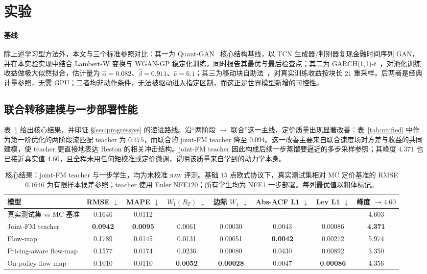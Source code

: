 \documentclass[11pt]{ctexart}
\newcommand{\tablebodysetup}{\footnotesize\setlength{\tabcolsep}{2pt}\renewcommand{\arraystretch}{1.12}}
\newcommand{\raw}{\textsc{raw}}
\newcommand{\best}[1]{\textbf{#1}}
\begin{document}
\section{实验}
\label{sec:results}

\paragraph{基线}
除上述学习型方法外，本文与三个标准参照对比：其一为 Quant-GAN~\citep{wiese2020quant} 核心结构基线，以 TCN 生成器/判别器复现金融时间序列 GAN，并在本实验实现中结合 Lambert-W 变换与 WGAN-GP 稳定化训练，同时报告其最优与最后检查点；其二为 GARCH(1,1)-$t$~\citep{bollerslev1986garch,bollerslev1987conditionally}，对池化训练收益做极大似然拟合，估计量为 $\hat\alpha{=}0.082$、$\hat\beta{=}0.911$、$\hat\nu{=}6.1$；其三为移动块自助法~\citep{kunsch1989jackknife,politis1994stationary}，对真实训练收益按块长 $21$ 重采样。后两者是经典计量参照，无需 GPU；二者均非动作条件，无法被驱动进入指定区制，而这正是世界模型新增的可控性。

\subsection{联合转移建模与一步部署性能}
\label{sec:res_main}
表~\ref{tab:main_joint} 给出核心结果，并印证 \S\ref{sec:progressive} 的递进路线。沿“两阶段 $\to$ 联合”这一主线，定价质量出现显著改善：表~\ref{tab:unified} 中作为第一阶优化的两阶段流匹配 teacher 为 $0.475$，而联合的 joint-FM teacher 降至 $0.094$。这一改善主要来自联合速度场对方差与收益的共同建模，使 teacher 更直接地表达 Heston 的相关冲击结构。joint-FM teacher 因此构成后续一步蒸馏要逼近的多步采样参照；其峰度 $4.371$ 也已接近真实值 $4.60$，且全程未用任何矩校准或定价微调，说明该质量来自学到的动力学本身。

\begin{table}[htbp]
\centering
\caption{核心结果：joint-FM teacher 与一步学生，均为未校准 \raw{} 评测。基础 $15$ 点欧式协议下，真实测试集相对 MC 定价基准的 RMSE $0.1646$ 为有限样本误差参照；teacher 使用 Euler NFE120；所有学生均为 NFE1 一步部署。每列最优值以粗体标记。}
\label{tab:main_joint}
\tablebodysetup
\begin{tabular}{l c c c c c c c}
\toprule
模型 & RMSE $\downarrow$ & MAPE $\downarrow$ & $W_1(R_T)$ $\downarrow$ & 边际 $W_1$ $\downarrow$ & Abs-ACF L1 $\downarrow$ & Lev L1 $\downarrow$ & 峰度 $\to4.60$ \\
\midrule
真实测试集 vs MC 基准 & 0.1646 & 0.0112 & -- & -- & -- & -- & 4.603 \\
Joint-FM teacher & \best{0.0942} & \best{0.0095} & 0.0061 & 0.00030 & 0.0043 & 0.00086 & \best{4.371} \\
Flow-map & 0.1789 & 0.0145 & 0.0131 & 0.00051 & \best{0.0042} & 0.00212 & 5.974 \\
Pricing-aware flow-map & 0.1577 & 0.0174 & 0.0236 & 0.00080 & 0.0430 & 0.00892 & 3.350 \\
On-policy flow-map & 0.1010 & 0.0110 & \best{0.0052} & \best{0.00028} & 0.0047 & \best{0.00086} & 4.356 \\
\bottomrule
\end{tabular}
\end{table}
\end{document}
